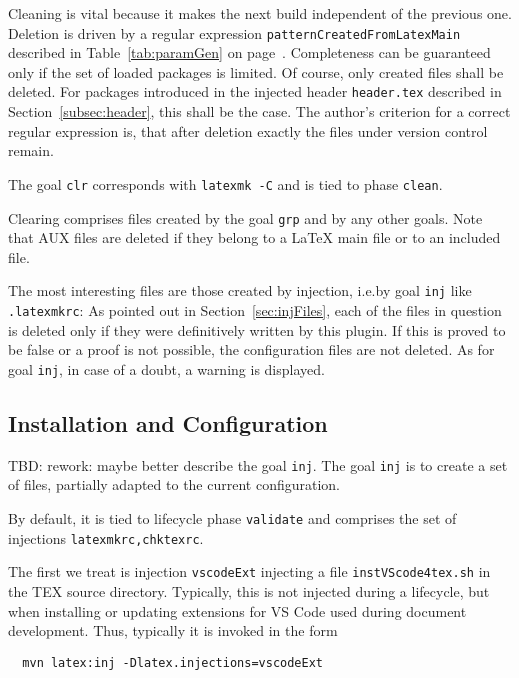 Cleaning is vital because it makes the next build independent of the previous one. 
Deletion is driven by a regular expression \texttt{patternCreatedFromLatexMain} 
described in Table~\ref{tab:paramGen} on page~\pageref{tab:paramGen}. 
Completeness can be guaranteed only 
if the set of loaded packages is limited. 
Of course, only created files shall be deleted. 
For packages introduced in the injected header \texttt{header.tex} 
described in Section~\ref{subsec:header}, this shall be the case. 
The author's criterion for a correct regular expression is, 
that after deletion exactly the files under version control remain. 

The goal \texttt{clr} corresponds with \texttt{latexmk -C} and is tied to phase \texttt{clean}. 

Clearing comprises files created by the goal \texttt{grp} and by any other goals. 
Note that AUX files are deleted if they belong to a \LaTeX{} main file or to an included file. 

The most interesting files are those created by injection, 
i.e.\@ by goal \texttt{inj} like \texttt{.latexmkrc}: 
As pointed out in Section~\ref{sec:injFiles}, 
each of the files in question is deleted only 
if they were definitively written by this plugin. 
If this is proved to be false or a proof is not possible, 
the configuration files are not deleted. 
As for goal \texttt{inj}, in case of a doubt, a warning is displayed. 



\subsection{Installation and Configuration}\label{subsec:develConfig}

TBD\@: rework: maybe better describe the goal \texttt{inj}. 
The goal \texttt{inj} is to create a set of files, 
partially adapted to the current configuration. 



By default, it is tied to lifecycle phase \texttt{validate} 
and comprises the set of injections \texttt{latexmkrc,chktexrc}. 

The first we treat is injection \texttt{vscodeExt} 
injecting a file \texttt{instVScode4tex.sh} in the TEX source directory. 
Typically, this is not injected during a lifecycle, 
but when installing or updating extensions for VS Code 
used during document development. 
Thus, typically it is invoked in the form 
%
\begin{verbatim}
  mvn latex:inj -Dlatex.injections=vscodeExt
\end{verbatim}


